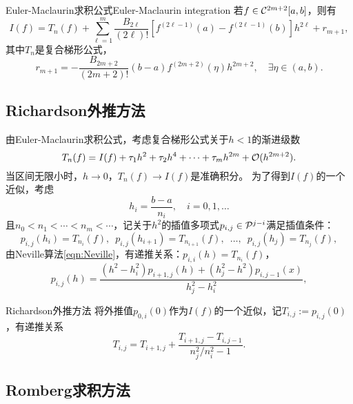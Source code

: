 \begin{theorem}
    {Euler-Maclaurin求积公式}{Euler-Maclaurin integration}
    若$f\in\mathcal C^{2m+2}[a,b]$，则有
    \begin{equation}
        I(f)=T_n(f)+\sum_{\ell=1}^m\frac{B_{2\ell}}{(2\ell)!}[f^{(2\ell-1)}(a)-f^{(2\ell-1)}(b)]h^{2\ell}+r_{m+1},
    \end{equation}
    其中$T_n$是复合梯形公式，
    \begin{equation}
        r_{m+1}=-\frac{B_{2m+2}}{(2m+2)!}(b-a)f^{(2m+2)}(\eta)h^{2m+2},\quad\exists\eta\in(a,b).
    \end{equation}
\end{theorem}

\subsection{Richardson外推方法}


由Euler-Maclaurin求积公式，考虑复合梯形公式关于$h<1$的渐进级数
\[
    T_n(f)=I(f)+\tau_1h^2+\tau_2h^4+\cdots+\tau_mh^{2m}+\mathcal O(h^{2m+2}).
\]
当区间无限小时，$h\to0$，$T_n(f)\to I(f)$是准确积分。
为了得到$I(f)$的一个近似，考虑
\[
    h_i=\frac{b-a}{n_i},\quad i=0,1,\ldots
\]
且$n_0<n_1<\cdots<n_m<\cdots$，记关于$h^2$的插值多项式$p_{i,j}\in\mathcal P^{j-i}$满足插值条件：
\[
    p_{i,j}(h_i)=T_{n_i}(f),\enspace
    p_{i,j}(h_{i+1})=T_{n_{i+1}}(f),\enspace
    \ldots,\enspace
    p_{i,j}(h_j)=T_{n_j}(f),
\]
由Neville算法\eqref{eqn:Neville}，有递推关系：$p_{i,i}(h)=T_{n_i}(f)$，
\[
    p_{i,j}(h)=\frac{(h^2-h_i^2)p_{i+1,j}(h)+(h_j^2-h^2)p_{i,j-1}(x)}{h_j^2-h_i^2},
\]

\begin{theorem}
    {Richardson外推方法}{}
    将外推值$p_{0,i}(0)$作为$I(f)$的一个近似，记$T_{i,j}:=p_{i,j}(0)$，有递推关系
    \begin{equation}
        \label{eqn:Richardson}
        T_{i,j}=T_{i+1,j}+\frac{T_{i+1,j}-T_{i,j-1}}{n_j^2/n_i^2-1}.
    \end{equation}
\end{theorem}

\subsection{Romberg求积方法}

